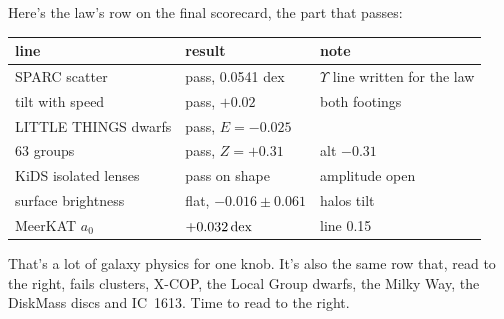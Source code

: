 Here's the law's row on the final scorecard, the part that passes:

\begin{center}\small
\begin{tabular}{@{}lll@{}}
\toprule
line & result & note\\
\midrule
SPARC scatter & pass, 0.0541 dex & $\Upsilon$ line written for the law\\
tilt with speed & pass, $+0.02$ & both footings\\
LITTLE THINGS dwarfs & pass, $E=-0.025$ & \\
63 groups & pass, $Z=+0.31$ & alt $-0.31$\\
KiDS isolated lenses & pass on shape & amplitude open\\
surface brightness & flat, $-0.016\pm0.061$ & halos tilt\\
MeerKAT $a_0$ & $+0.032\,\mathrm{dex}$ & line 0.15\\
\bottomrule
\end{tabular}
\end{center}

That's a lot of galaxy physics for one knob. It's also the same row that, read to the right, fails clusters, X-COP, the Local Group dwarfs, the Milky Way, the DiskMass discs and IC~1613. Time to read to the right.
